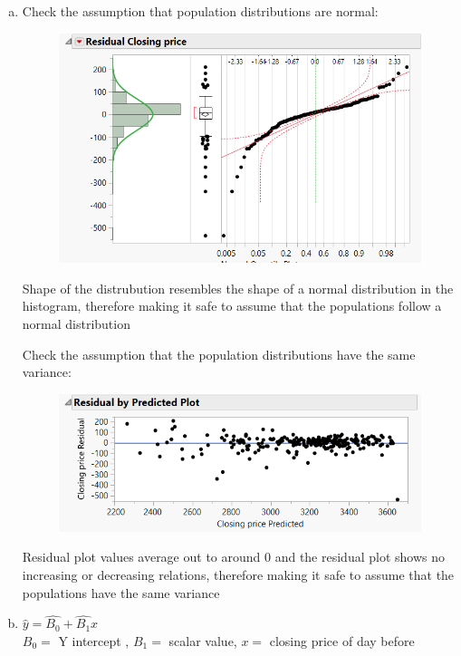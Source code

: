 \documentclass[14pt]{article}
\begin{document}
\begin{enumerate}
\begin{enumerate}[(a)]
\item
Check the assumption that population distributions are normal:
\begin{figure}[h]
\includegraphics[scale=0.75]{exam3Pics/2-2-b-1.PNG}
\centering
\end{figure}

Shape of the distrubution resembles the shape of a normal distribution in the histogram, therefore making it safe to assume that the populations follow a normal distribution 

\pagebreak

Check the assumption that the population distributions have the same variance:
\begin{figure}[h]
\includegraphics{exam3Pics/2-2-b-2.PNG}
\centering
\end{figure}

Residual plot values average out to around 0 and the residual plot shows no increasing or decreasing relations, therefore making it safe to assume that the populations have the same variance 

\vspace{1em}

\item
$\hat{y} = \hat{B_0} + \hat{B_1}x$ \\
$B_0 =$ Y intercept , $B_1 =$ scalar value, $x = $ closing price of day before


\end{enumerate}
\end{enumerate}
\end{document}
